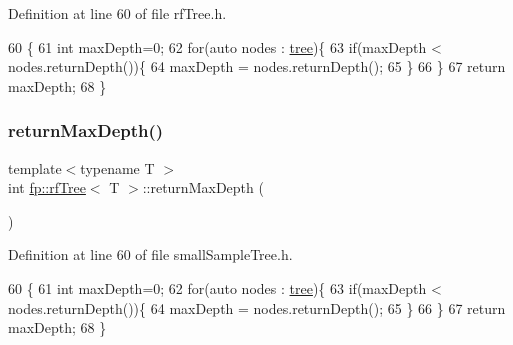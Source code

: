 Definition at line 60 of file rf\+Tree.\+h.


\begin{DoxyCode}
60                                            \{
61                     \textcolor{keywordtype}{int} maxDepth=0;
62                     \textcolor{keywordflow}{for}(\textcolor{keyword}{auto} nodes : \hyperlink{classtree}{tree})\{
63                         \textcolor{keywordflow}{if}(maxDepth < nodes.returnDepth())\{
64                             maxDepth = nodes.returnDepth();
65                         \}
66                     \}
67                     \textcolor{keywordflow}{return} maxDepth;
68                 \}
\end{DoxyCode}
\mbox{\label{classfp_1_1rfTree_ab439134c1e24059fe74f84ac8eff78dd}} 
\subsubsection{\texorpdfstring{return\+Max\+Depth()}{returnMaxDepth()}\hspace{0.1cm}{\footnotesize\ttfamily [2/2]}}
{\footnotesize\ttfamily template$<$typename T $>$ \\
int \hyperlink{classfp_1_1rfTree}{fp\+::rf\+Tree}$<$ T $>$\+::return\+Max\+Depth (\begin{DoxyParamCaption}{ }\end{DoxyParamCaption})\hspace{0.3cm}{\ttfamily [inline]}}



Definition at line 60 of file small\+Sample\+Tree.\+h.


\begin{DoxyCode}
60                                            \{
61                     \textcolor{keywordtype}{int} maxDepth=0;
62                     \textcolor{keywordflow}{for}(\textcolor{keyword}{auto} nodes : \hyperlink{classtree}{tree})\{
63                         \textcolor{keywordflow}{if}(maxDepth < nodes.returnDepth())\{
64                             maxDepth = nodes.returnDepth();
65                         \}
66                     \}
67                     \textcolor{keywordflow}{return} maxDepth;
68                 \}
\end{DoxyCode}
\mbox{\label{classfp_1_1rfTree_a6474edd1b84d70be1712326f9a845139}} 
